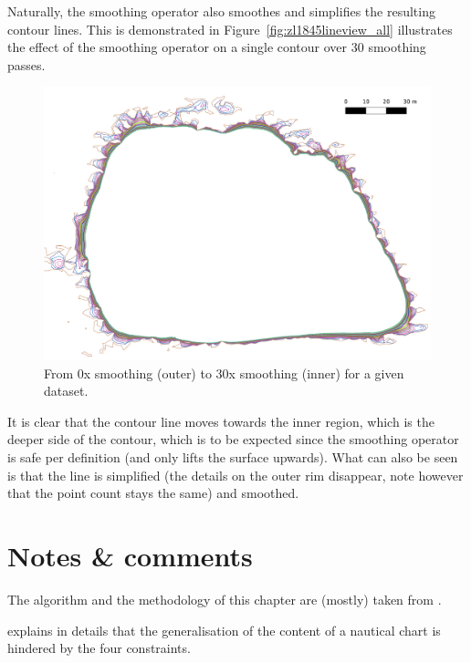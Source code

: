 Naturally, the smoothing operator also smoothes and simplifies the resulting contour lines. 
This is demonstrated in Figure~\ref{fig:zl1845lineview_all} illustrates the effect of the smoothing operator on a single contour over 30 smoothing passes. 
\begin{figure}
  \centering
  \includegraphics[width=0.95\linewidth]{figs/zl1845detailcontours0-30.pdf}
  \caption{From 0x smoothing (outer) to 30x smoothing (inner) for a given dataset.}
\label{fig:zl1845lineview}
\end{figure}
It is clear that the contour line moves towards the inner region, which is the deeper side of the contour, which is to be expected since the smoothing operator is safe per definition (and only lifts the surface upwards). 
What can also be seen is that the line is simplified (the details on the outer rim disappear, note however that the point count stays the same) and smoothed. 


%
\section{Notes \& comments}

The algorithm and the methodology of this chapter are (mostly) taken from \citet{Peters14}.

\citet{Zhang11} explains in details that the generalisation of the content of a nautical chart is hindered by  the four constraints.

